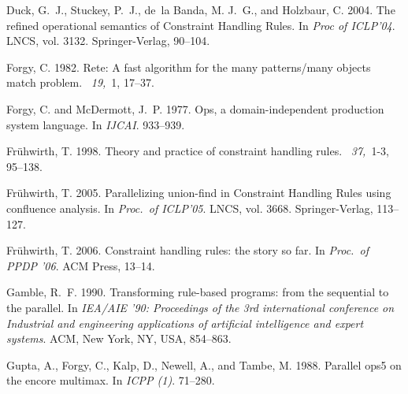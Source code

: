 \documentclass{tlp}
\begin{document}
\begin{thebibliography}{}
{\sc Duck, G.~J.}, {\sc Stuckey, P.~J.}, {\sc de~la Banda, M. J.~G.}, {\sc and}
  {\sc Holzbaur, C.} 2004.
\newblock The refined operational semantics of {Constraint Handling Rules}.
\newblock In {\em Proc of ICLP'04}. LNCS, vol. 3132. Springer-Verlag, 90--104.

{\sc Forgy, C.} 1982.
\newblock Rete: A fast algorithm for the many patterns/many objects match
  problem.
~{\em 19,\/}~1, 17--37.

{\sc Forgy, C.} {\sc and} {\sc McDermott, J.~P.} 1977.
\newblock Ops, a domain-independent production system language.
\newblock In {\em IJCAI}. 933--939.

{\sc Fr{\"u}hwirth, T.} 1998.
\newblock Theory and practice of constraint handling rules.
~{\em 37,\/}~1-3, 95--138.

{\sc Fr{\"u}hwirth, T.} 2005.
\newblock Parallelizing union-find in {Constraint Handling Rules} using
  confluence analysis.
\newblock In {\em Proc.\ of ICLP'05}. LNCS, vol. 3668. Springer-Verlag,
  113--127.

{\sc Fr{\"u}hwirth, T.} 2006.
\newblock Constraint handling rules: the story so far.
\newblock In {\em Proc.\ of PPDP '06}. ACM Press, 13--14.

{\sc Gamble, R.~F.} 1990.
\newblock Transforming rule-based programs: from the sequential to the
  parallel.
\newblock In {\em IEA/AIE '90: Proceedings of the 3rd international conference
  on Industrial and engineering applications of artificial intelligence and
  expert systems}. ACM, New York, NY, USA, 854--863.

{\sc Gupta, A.}, {\sc Forgy, C.}, {\sc Kalp, D.}, {\sc Newell, A.}, {\sc and}
  {\sc Tambe, M.} 1988.
\newblock Parallel ops5 on the encore multimax.
\newblock In {\em ICPP (1)}. 71--280.


\end{thebibliography}
\end{document}
